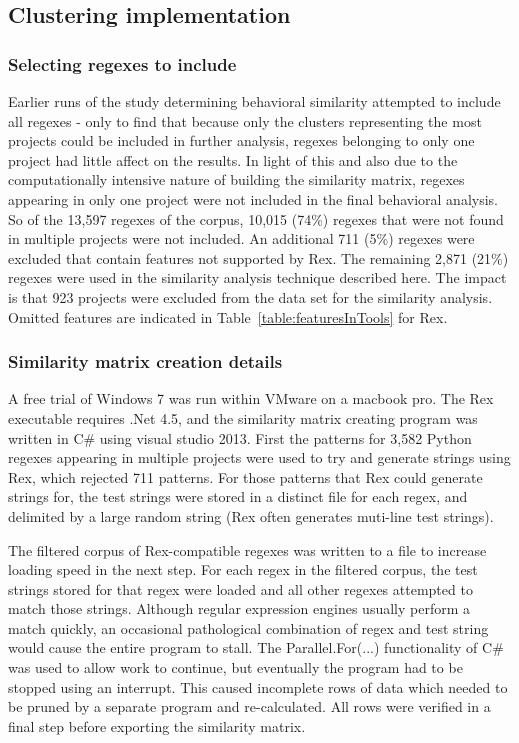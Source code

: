 \subsection{Clustering implementation}

\subsubsection{Selecting regexes to include}
Earlier runs of the study determining behavioral similarity attempted to include all regexes - only to find that because only the clusters representing the most projects could be included in further analysis, regexes belonging to only one project had little affect on the results. In light of this and also due to the computationally intensive nature of building the similarity matrix, regexes appearing in only one project were not included in the final behavioral analysis.  So of the 13,597 regexes of the corpus, 10,015 (74\%) regexes that were not found in multiple projects were not included.
An additional 711 (5\%) regexes were excluded that contain features not supported by Rex.  The remaining 2,871 (21\%) regexes were used in the similarity analysis technique described here. The impact is that 923 projects were excluded from the data set for the similarity analysis. Omitted features are indicated in Table~\ref{table:featuresInTools} for Rex.

\subsubsection{Similarity matrix creation details}
A free trial of Windows 7 was run within VMware on a macbook pro.  The Rex executable requires .Net 4.5, and the similarity matrix creating program was written in C\# using visual studio 2013.  First the patterns for 3,582 Python regexes appearing in multiple projects were used to try and generate strings using Rex, which rejected 711 patterns.  For those patterns that Rex could generate strings for, the test strings were stored in a distinct file for each regex, and delimited by a large random string (Rex often generates muti-line test strings).

The filtered corpus of Rex-compatible regexes was written to a file to increase loading speed in the next step.  For each regex in the filtered corpus, the test strings stored for that regex were loaded and all other regexes attempted to match those strings.  Although regular expression engines usually perform a match quickly, an occasional pathological combination of regex and test string would cause the entire program to stall.  The Parallel.For(...) functionality of C\# was used to allow work to continue, but eventually the program had to be stopped using an interrupt.  This caused incomplete rows of data which needed to be pruned by a separate program and re-calculated.  All rows were verified in a final step before exporting the similarity matrix.

